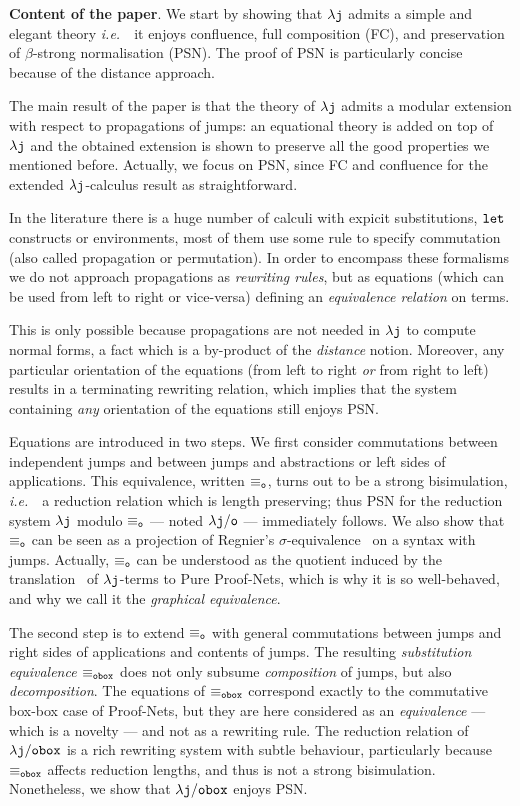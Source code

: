 \documentclass{LMCS}
\newcommand{\ie}{{\it  i.e.}~}
\renewcommand{\>}{\rightarrow}
\def\lam{\lambda}
\newcommand{\dis}{{\tt j}}
\newcommand{\ldis}{\lam{\dis}}
\newcommand{\lj}{\lam{\dis}}
\newcommand{\deft}[1]{{\bf #1}}
\newcommand{\modulo}[2]{#1/#2}
\newcommand{\eqw}[1]{\equiv_{#1}}
\newcommand{\eqo}{\equiv_\osym}
\newcommand{\osym}{{\tt o}}
\newcommand{\ldiso}{\ldis/{\osym}}
\newcommand{\ldisf}{\lam \modulo{\dis}{\fsymb}}
\newcommand{\fsymb}{\osymb\boite}
\newcommand{\osymb}{{\tt o}}
\newcommand{\eqf}{\eqw{\fsymb}}
\newcommand{\boite}{{\tt box}}
\begin{document}
\deft{Content of the paper}.
We start by showing that $\ldis$ admits a simple and elegant
theory \ie\  it enjoys  confluence, full composition (FC), and preservation of
$\beta$-strong normalisation (PSN). The proof of PSN is particularly
concise because of the distance approach.

The main result of the paper is that the theory of $\lj$ admits a
modular extension with respect to propagations of jumps:
an equational theory is added on top
of $\ldis$ and the obtained extension is  shown to
preserve all the good properties we mentioned
  before. Actually, we focus on PSN, since FC and confluence for the
extended $\ldis$-calculus result as straightforward.

In the literature there is a huge number of calculi with expicit
substitutions, ${\tt let}$ constructs or environments, most of them
use some rule to specify commutation (also called
propagation or permutation). In order to encompass these formalisms we
do not approach propagations as \textit{rewriting rules}, but as
equations (which can be used from left to right or vice-versa)
  defining an \textit{equivalence relation}  on terms.

This is only possible because propagations are
not needed in $\ldis$ to compute normal forms, a fact which is a by-product
of the
  \textit{distance} notion.  Moreover, any particular orientation
of the equations (from left to
  right \textit{or} from right to left) results in a terminating
rewriting relation, which implies that the system containing \textit{any} orientation of the 
equations still enjoys PSN.

Equations are introduced in two steps.  We first consider commutations
between independent jumps
and between jumps and  abstractions or left sides of applications. 
This equivalence, written $\eqo$, turns out to be a strong
bisimulation, \ie\ a 
reduction  relation
which is length preserving; thus PSN
for the reduction system $\ldis$ modulo $\eqo$ --- noted $\ldiso$ --- immediately follows. We also
show that $\eqo$ can be seen as a projection of Regnier's
$\sigma$-equivalence~\cite{regnier94} on a syntax with
jumps. Actually, $\eqo$ can be understood as the quotient induced by
the translation~\cite{AccattoliTh} of $\ldis$-terms to Pure
Proof-Nets, which is why it is so well-behaved, and why we call it the
\textit{graphical equivalence}.


The second step is to extend $\eqo$ with general commutations between
jumps and right sides of applications and
contents of jumps.  
 The resulting \textit{substitution equivalence $\eqf$} does not
  only subsume \textit{composition} of jumps, but also
  \textit{decomposition}.  The equations of $\eqf$ correspond
  exactly to the commutative box-box case of Proof-Nets, but they are
  here considered as an \textit{equivalence} --- which is a novelty ---
  and not as a rewriting rule. The reduction relation of $\ldisf$ is a
  rich rewriting system with subtle behaviour, particularly because
  $\eqf$ affects reduction lengths, and thus is not a strong
  bisimulation. Nonetheless, we show that $\ldisf$ enjoys PSN.
\end{document}
